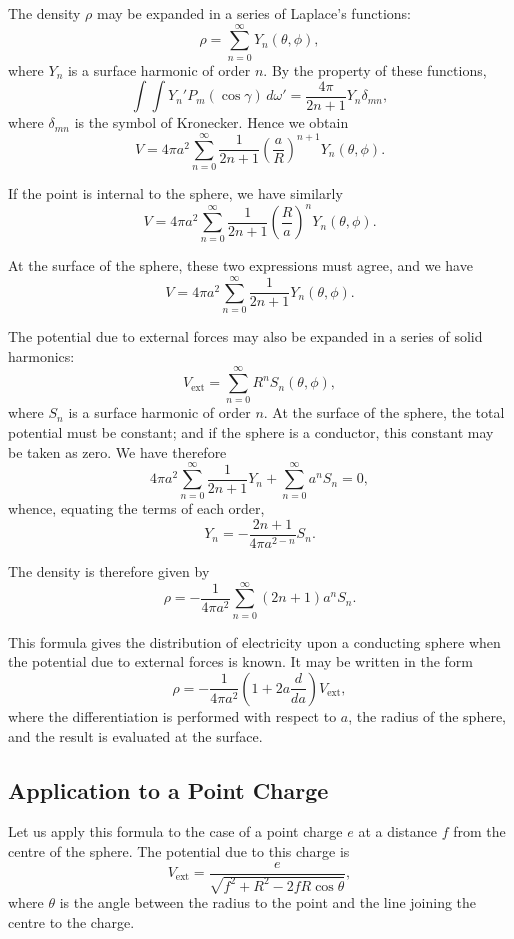 \documentclass[11pt,a4paper]{book}
\begin{document}
\setcounter{page}{94}

The density $\rho$ may be expanded in a series of Laplace's functions:
\[
\rho = \sum_{n=0}^{\infty} Y_n(\theta,\phi),
\]
where $Y_n$ is a surface harmonic of order $n$. By the property of these functions,
\[
\int\!\!\int Y_n' P_m(\cos\gamma) \, d\omega' = \frac{4\pi}{2n+1} Y_n \delta_{mn},
\]
where $\delta_{mn}$ is the symbol of Kronecker. Hence we obtain
\[
V = 4\pi a^2 \sum_{n=0}^{\infty} \frac{1}{2n+1} \left(\frac{a}{R}\right)^{n+1} Y_n(\theta,\phi).
\]

If the point is internal to the sphere, we have similarly
\[
V = 4\pi a^2 \sum_{n=0}^{\infty} \frac{1}{2n+1} \left(\frac{R}{a}\right)^{n} Y_n(\theta,\phi).
\]

\setcounter{page}{95}

At the surface of the sphere, these two expressions must agree, and we have
\[
V = 4\pi a^2 \sum_{n=0}^{\infty} \frac{1}{2n+1} Y_n(\theta,\phi).
\]

The potential due to external forces may also be expanded in a series of solid harmonics:
\[
V_{\text{ext}} = \sum_{n=0}^{\infty} R^n S_n(\theta,\phi),
\]
where $S_n$ is a surface harmonic of order $n$. At the surface of the sphere, the total potential must be constant; and if the sphere is a conductor, this constant may be taken as zero. We have therefore
\[
4\pi a^2 \sum_{n=0}^{\infty} \frac{1}{2n+1} Y_n + \sum_{n=0}^{\infty} a^n S_n = 0,
\]
whence, equating the terms of each order,
\[
Y_n = -\frac{2n+1}{4\pi a^{2-n}} S_n.
\]

\setcounter{page}{96}

The density is therefore given by
\[
\rho = -\frac{1}{4\pi a^2} \sum_{n=0}^{\infty} (2n+1) a^n S_n.
\]

This formula gives the distribution of electricity upon a conducting sphere when the potential due to external forces is known. It may be written in the form
\[
\rho = -\frac{1}{4\pi a^2} \left(1 + 2a\frac{d}{da}\right) V_{\text{ext}},
\]
where the differentiation is performed with respect to $a$, the radius of the sphere, and the result is evaluated at the surface.

\subsection*{Application to a Point Charge}

Let us apply this formula to the case of a point charge $e$ at a distance $f$ from the centre of the sphere. The potential due to this charge is
\[
V_{\text{ext}} = \frac{e}{\sqrt{f^2 + R^2 - 2fR\cos\theta}},
\]
where $\theta$ is the angle between the radius to the point and the line joining the centre to the charge.
\end{document}
